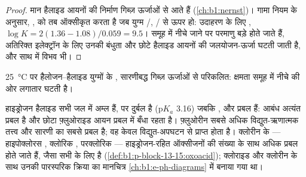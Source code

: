 \begin{proof}
मान हैलाइड आयनों की निर्माण गिब्ज़ ऊर्जाओं से आते हैं
(\cref{ch:b1:nernst})। गामा नियम के अनुसार, ,  को तब ऑक्सीकृत करता है जब
युग्म /, / से ऊपर हो: उदाहरण के लिए
, $\log K = 2(1.36 - 1.08)/0.059 = 9.5$।
समूह में नीचे जाने पर परमाणु बड़े होते जाते हैं, अतिरिक्त इलेक्ट्रॉन के लिए उनकी बंधुता और
छोटे हैलाइड आयनों की जलयोजन-ऊर्जा घटती जाती है, और साथ में विभव भी।
\end{proof}

\begin{omfigure}

{\small \qty{25}{\celsius} पर हैलोजन--हैलाइड युग्मों के ,
सारणीबद्ध गिब्ज़ ऊर्जाओं से परिकलित: 
क्षमता समूह में नीचे की ओर लगातार घटती है।}
\end{omfigure}

हाइड्रोजन हैलाइड सभी जल में अम्ल हैं, पर  दुर्बल है
($\mathrm{p}K_a$ 3.16) जबकि ,  और  प्रबल हैं:
 आबंध अत्यंत प्रबल है और छोटा फ़्लुओराइड आयन प्रबल
 में बँधा रहता है। फ़्लुओरीन सबसे अधिक विद्युत-ऋणात्मक तत्त्व और
सारणी का सबसे प्रबल  है; वह केवल विद्युत-अपघटन से प्राप्त होता है।
क्लोरीन के  --- हाइपोक्लोरस , क्लोरिक ,
परक्लोरिक  --- हाइड्रोजन-रहित ऑक्सीजनों की संख्या के साथ
अधिक प्रबल होते जाते हैं, जैसा सभी  के लिए है (\cref{def:b1:p-block-13-15:oxoacid}); क्लोराइड और क्लोरीन के साथ
उनकी पारस्परिक क्रिया का मानचित्र \cref{ch:b1:e-ph-diagrams} में बनाया गया था।

